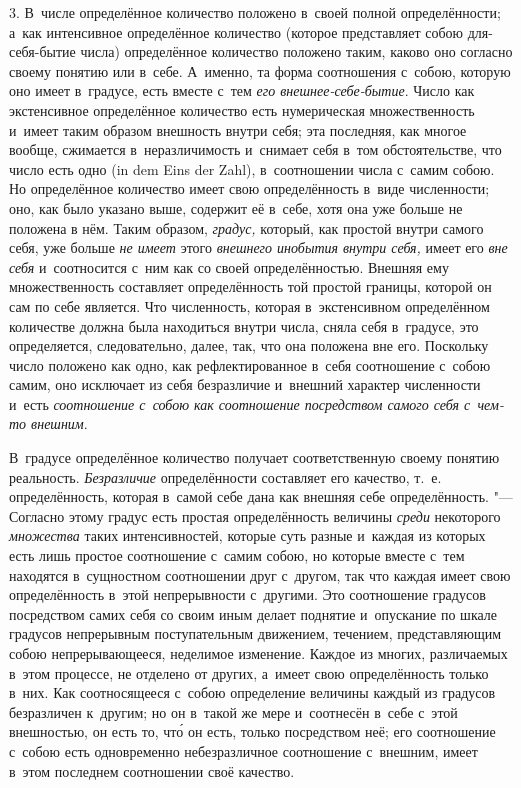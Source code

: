 3. В~числе определённое количество положено в~своей полной определённости;
а~как интенсивное определённое количество (которое представляет собою
для-себя-бытие числа) определённое количество положено таким, каково оно
согласно своему понятию или в~себе. А~именно, та форма соотношения с~собою,
которую оно имеет в~градусе, есть вместе с~тем
{\em его внешнее-себе-бытие}. Число как экстенсивное определённое количество есть нумерическая
множественность и~имеет таким образом внешность внутри себя; эта последняя, как
многое вообще, сжимается в~неразличимость и~снимает себя в~том обстоятельстве,
что число есть одно (in dem Eins der Zahl), в~соотношении числа с~самим собою.
Но определённое количество имеет свою определённость в~виде численности; оно,
как было указано выше, содержит её в~себе, хотя она уже больше не положена в
нём. Таким образом, {\em градус,} который, как простой внутри самого себя, уже
больше {\em не имеет} этого {\em внешнего инобытия внутри себя,} имеет его
{\em вне себя} и~соотносится с~ним как со своей определённостью. Внешняя ему
множественность составляет определённость той простой границы, которой он сам
по себе является. Что численность, которая в~экстенсивном определённом
количестве должна была находиться внутри числа, сняла себя в~градусе, это
определяется, следовательно, далее, так, что она положена вне его. Поскольку
число положено как одно, как рефлектированное в~себя соотношение с~собою самим,
оно исключает из себя безразличие и~внешний характер численности и~есть
{\em соотношение с~собою как соотношение посредством
самого себя с~чем-то внешним}.

В~градусе определённое количество получает соответственную своему понятию
реальность. {\em Безразличие} определённости составляет его качество, т.~е.
определённость, которая в~самой себе дана как внешняя себе определённость. "---
Согласно этому градус есть простая определённость величины {\em среди}
некоторого {\em множества} таких интенсивностей, которые суть разные и~каждая
из которых есть лишь простое соотношение с~самим собою, но которые вместе с~тем
находятся в~сущностном соотношении друг с~другом, так что каждая имеет свою
определённость в~этой непрерывности с~другими. Это соотношение градусов
посредством самих себя со своим иным делает поднятие и~опускание по шкале
градусов непрерывным поступательным движением, течением, представляющим собою
непрерывающееся, неделимое изменение. Каждое из многих, различаемых в~этом
процессе, не отделено от других, а~имеет свою определённость только в~них. Как
соотносящееся с~собою определение величины каждый из градусов безразличен
к~другим; но он в~такой же мере и~соотнесён в~себе с~этой внешностью, он есть
то, чт\'{о} он есть, только посредством неё; его соотношение с~собою есть
одновременно небезразличное соотношение с~внешним, имеет в~этом последнем
соотношении своё качество.

